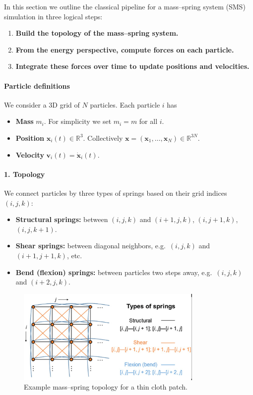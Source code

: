 \documentclass{article}
\begin{document}
In this section we outline the classical pipeline for a mass–spring system (SMS) simulation in three logical steps:

\begin{enumerate}
  \item \textbf{Build the topology of the mass–spring system.}
  \item \textbf{From the energy perspective, compute forces on each particle.}
  \item \textbf{Integrate these forces over time to update positions and velocities.}
\end{enumerate}

\paragraph{Particle definitions}  
We consider a 3D grid of \(N\) particles.  Each particle \(i\) has
\begin{itemize}
  \item \textbf{Mass} \(m_i\).  For simplicity we set \(m_i = m\) for all \(i\).
  \item \textbf{Position} \(\mathbf{x}_i(t)\in\mathbb{R}^3\).  Collectively \(\mathbf{x}=(\mathbf{x}_1,\dots,\mathbf{x}_N)\in\mathbb{R}^{3N}\).
  \item \textbf{Velocity} \(\mathbf{v}_i(t)=\dot{\mathbf{x}}_i(t)\).
\end{itemize}

\paragraph{1. Topology}  
We connect particles by three types of springs based on their grid indices \((i,j,k)\):
\begin{itemize}
  \item \textbf{Structural springs:} between \((i,j,k)\) and \((i+1,j,k)\), \((i,j+1,k)\), \((i,j,k+1)\).
  \item \textbf{Shear springs:} between diagonal neighbors, e.g.\ \((i,j,k)\) and \((i+1,j+1,k)\), etc.
  \item \textbf{Bend (flexion) springs:} between particles two steps away, e.g.\ \((i,j,k)\) and \((i+2,j,k)\).
\end{itemize}

\begin{figure}[!ht]
  \centering
  \includegraphics[width=0.8\textwidth]{images/fig2.0.png}
  \caption{Example mass–spring topology for a thin cloth patch.}
  \label{fig:simple_mass_spring}
\end{figure}
\end{document}
